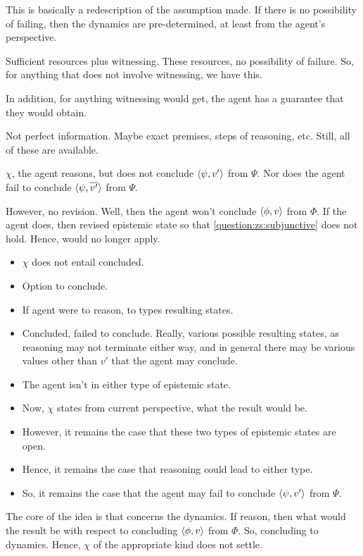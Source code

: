 \begin{note}
  This is basically a redescription of the assumption made.
  If there is no possibility of failing, then the dynamics are pre-determined, at least from the agent's perspective.





  Sufficient resources plus witnessing.
  These resources, no possibility of failure.
  So, for anything that does not involve witnessing, we have this.

  In addition, for anything witnessing would get, the agent has a guarantee that they would obtain.

  Not perfect information.
  Maybe exact premises, steps of reasoning, etc.
  Still, all of these are available.
\end{note}



\begin{note}
  \(\chi\), the agent reasons, but does not conclude \(\langle \psi, v' \rangle\) from \(\Psi\).
  Nor does the agent fail to conclude \(\langle \psi, \overline{v'} \rangle\) from \(\Psi\).

  However, no revision.
  Well, then the agent won't conclude \(\langle \phi, v \rangle\) from \(\Phi\).
  If the agent does, then revised epistemic state so that \ref{question:zs:subjunctive} does not hold.
  Hence, \qzS{} would no longer apply.
\end{note}

\begin{note}
  \begin{itemize}
  \item
    \(\chi\) does not entail concluded.
  \item
    Option to conclude.
  \item
    If agent were to reason, to types resulting states.
  \item
    Concluded, failed to conclude.
    Really, various possible resulting states, as reasoning may not terminate either way, and in general there may be various values other than \(v'\) that the agent may conclude.
  \item
    The agent isn't in either type of epistemic state.
  \item
    Now, \(\chi\) states from current perspective, what the result would be.
  \item
    However, it remains the case that these two types of epistemic states are open.
  \item
    Hence, it remains the case that reasoning could lead to either type.
  \item
    So, it remains the case that the agent may fail to conclude \(\langle \psi, v' \rangle\) from \(\Psi\).
  \end{itemize}

  The core of the idea is that \qzS{} concerns the dynamics.
  If reason, then what would the result be with respect to concluding \(\langle \phi, v \rangle\) from \(\Phi\).
  So, concluding to dynamics.
  Hence, \(\chi\) of the appropriate kind does not settle.
\end{note}

